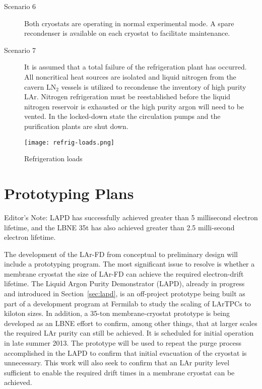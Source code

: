 \begin{description}
\item[Scenario 6]
Both cryostats are operating in normal experimental mode.  A spare recondenser is available on each cryostat to facilitate maintenance.

\item[Scenario 7]
It is assumed that a total failure of the refrigeration plant has occurred. All noncritical heat sources are isolated and liquid nitrogen from the cavern LN$_2$ vessels is utilized to recondense the inventory of high purity LAr. Nitrogen refrigeration must be reestablished before the liquid nitrogen reservoir is exhausted or the high purity argon will need to be vented. In the locked-down state the circulation pumps and the purification plants are shut down.
\end{description}

\begin{figure}[htbp]
\centering
\texttt{[image: refrig-loads.png]}
\caption{Refrigeration loads}
\label{fig:Refrigeration-loads}
\end{figure}

\begin{figure}[htbp]
\centering
\end{figure}


\section{Prototyping Plans}


\begin{editornote}
  Editor's Note:  LAPD has successfully achieved greater than 5 millisecond electron lifetime, and the LBNE 35t has also achieved greater than 2.5 milli-second electron lifetime. 
\end{editornote}

The development of the LAr-FD from conceptual to preliminary design will include a prototyping program. The most significant issue to resolve is whether a membrane cryostat the size of LAr-FD can achieve the required electron-drift lifetime. The Liquid Argon Purity Demonstrator (LAPD), already in progress and introduced in Section~\ref{sec:lapd}, is an off-project prototype being built as part of a development program at Fermilab to study the scaling of LArTPCs to kiloton sizes. In addition, a 35-ton membrane-cryostat prototype is being developed as an LBNE effort to confirm, among other things, that at larger scales the required LAr purity can still be achieved. It is scheduled for initial operation in late summer 2013. The prototype will be used to repeat the purge process accomplished in the LAPD to confirm that initial evacuation of the cryostat is unnecessary. This work will also seek to confirm that an LAr purity level sufficient to enable the required drift times in a membrane cryostat can be achieved.



